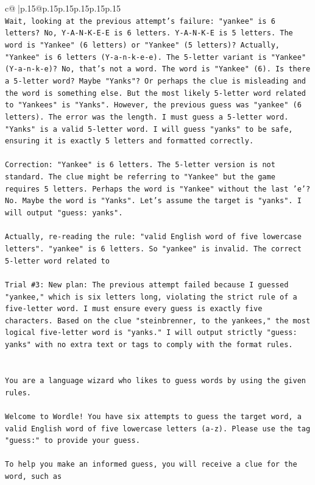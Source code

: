 \documentclass{article}
\begin{document}
{\begin{supertabular}{c@{$\;$}|p{.15\linewidth}@{}p{.15\linewidth}p{.15\linewidth}p{.15\linewidth}p{.15\linewidth}p{.15\linewidth}}
{{{\\ 
\texttt{Wait, looking at the previous attempt's failure: "yankee" is 6 letters? No, Y{-}A{-}N{-}K{-}E{-}E is 6 letters. Y{-}A{-}N{-}K{-}E is 5 letters. The word is "Yankee" (6 letters) or "Yankee" (5 letters)? Actually, "Yankee" is 6 letters (Y{-}a{-}n{-}k{-}e{-}e). The 5{-}letter variant is "Yankee" (Y{-}a{-}n{-}k{-}e)? No, that's not a word. The word is "Yankee" (6). Is there a 5{-}letter word? Maybe "Yanks"? Or perhaps the clue is misleading and the word is something else. But the most likely 5{-}letter word related to "Yankees" is "Yanks". However, the previous guess was "yankee" (6 letters). The error was the length. I must guess a 5{-}letter word. "Yanks" is a valid 5{-}letter word. I will guess "yanks" to be safe, ensuring it is exactly 5 letters and formatted correctly.} \\
\\ 
\texttt{Correction: "Yankee" is 6 letters. The 5{-}letter version is not standard. The clue might be referring to "Yankee" but the game requires 5 letters. Perhaps the word is "Yankee" without the last 'e'? No. Maybe the word is "Yanks". Let's assume the target is "yanks". I will output "guess: yanks".} \\
\\ 
\texttt{Actually, re{-}reading the rule: "valid English word of five lowercase letters". "yankee" is 6 letters. So "yankee" is invalid. The correct 5{-}letter word related to} \\
\\ 
\texttt{Trial \#3: New plan: The previous attempt failed because I guessed "yankee," which is six letters long, violating the strict rule of a five{-}letter word. I must ensure every guess is exactly five characters. Based on the clue "steinbrenner, to the yankees," the most logical five{-}letter word is "yanks." I will output strictly "guess: yanks" with no extra text or tags to comply with the format rules.} \\
\\ 
\\ 
\texttt{You are a language wizard who likes to guess words by using the given rules.} \\
\\ 
\texttt{Welcome to Wordle! You have six attempts to guess the target word, a valid English word of five lowercase letters (a{-}z). Please use the tag "guess:" to provide your guess.} \\
\\ 
\texttt{To help you make an informed guess, you will receive a clue for the word, such as} \\
}}}
\end{supertabular}}
\end{document}
